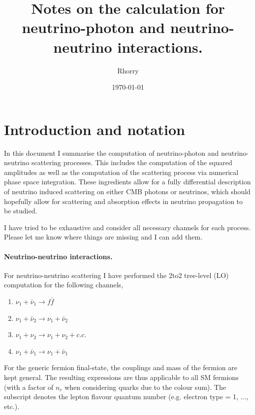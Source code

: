 \documentclass[a4paper,11pt]{article}
\begin{document}
\title{Notes on the calculation for neutrino-photon and neutrino-neutrino interactions.}

\author[1]{Rhorry}

\date{\today}


\maketitle
\flushbottom

\section{Introduction and notation}

In this document I summarise the computation of neutrino-photon and neutrino-neutrino scattering processes. This includes the computation of the squared amplitudes as well as the computation of the scattering process via numerical phase space integration.
%
These ingredients allow for a fully differential description of neutrino induced scattering on either CMB photons or neutrinos, which should hopefully allow for scattering and absorption effects in neutrino propagation to be studied.

I have tried to be exhaustive and consider all necessary channels for each process. Please let me know where things are missing and I can add them.

\paragraph{Neutrino-neutrino interactions.} For neutrino-neutrino scattering I have performed the 2to2 tree-level (LO) computation for the following channels,
\begin{enumerate}
	\item $\nu_1 + \bar{\nu}_1 \to f \bar f$
	\item $\nu_1 + \bar{\nu}_2 \to \nu_1 + \bar{\nu}_2$
	\item $\nu_1 + \nu_2 \to\nu_1 + \nu_2 + c.c.$
	\item $\nu_1 + \bar{\nu}_1 \to \nu_1 + \bar{\nu}_1$
\end{enumerate}
For the generic fermion final-state, the couplings and mass of the fermion are kept general. The resulting expressions are thus applicable to all SM fermions (with a factor of $n_c$ when considering quarks due to the colour sum). The subscript denotes the lepton flavour quantum number (e.g. electron type = 1, ..., etc.).
\end{document}
